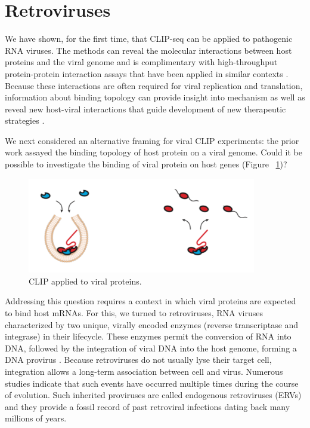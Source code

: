 \section{Retroviruses}

We have shown, for the first time, that CLIP-seq can be applied to pathogenic RNA viruses. The methods can reveal the molecular interactions between host proteins and the viral genome and is complimentary with high-throughput protein-protein interaction assays that have been applied in similar contexts \cite{Jager:2011de}. Because these interactions are often required for viral replication and translation, information about binding topology can provide insight into mechanism \cite{Walsh:2011kt} as well as reveal new host-viral interactions that guide development of new therapeutic strategies  \cite{Jopling:2005ij}.

We next considered an alternative framing for viral CLIP experiments: the prior work assayed the binding topology of host protein on a viral genome. Could it be possible to investigate the binding of viral protein on host genes (Figure ~\ref{fig:Fig23})?
 
\begin{figure}
\center\includegraphics[width=100mm,scale=0.5]{Figures/Fig23}
\caption{CLIP applied to viral proteins.}
\label{fig:Fig23}
\end{figure}

Addressing this question requires a context in which viral proteins are expected to bind host mRNAs. For this, we turned to retroviruses, RNA viruses characterized by two unique, virally encoded enzymes (reverse transcriptase and integrase) in their lifecycle. These enzymes permit the conversion of RNA into DNA, followed by the integration of viral DNA into the host genome, forming a DNA provirus \cite{Stoye:2012gqa}. Because retroviruses do not usually lyse their target cell, integration allows a long-term association between cell and virus. Numerous studies indicate that such events have occurred multiple times during the course of evolution. Such inherited proviruses are called endogenous retroviruses (ERVs) and they provide a fossil record of past retroviral infections dating back many millions of years. 

